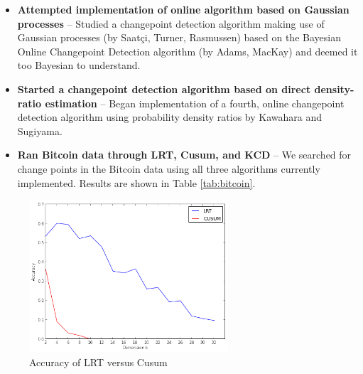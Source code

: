 \documentclass[10pt,letterpaper]{article}
\begin{document}
\begin{itemize}
\item \textbf{Attempted implementation of online algorithm based on Gaussian processes} -- Studied a changepoint detection algorithm making use of Gaussian processes (by Saat\c{c}i, Turner, Rasmussen) based on the Bayesian Online Changepoint Detection algorithm (by Adams, MacKay) and deemed it too Bayesian to understand.
\item \textbf{Started a changepoint detection algorithm based on direct density-ratio estimation} -- Began implementation of a fourth, online changepoint detection algorithm using probability density ratios by Kawahara and Sugiyama.

\item \textbf{Ran Bitcoin data through LRT, Cusum, and KCD} -- We searched for change points in the Bitcoin data using all three algorithms currently implemented. Results are shown in Table \ref{tab:bitcoin}.

\end{itemize}

\begin{figure}[htbp]
\begin{center}
\includegraphics[width=0.66\textwidth]{LrtVCusum.png}
\caption{Accuracy of LRT versus Cusum}
\label{fig:lrtVcusum}
\end{center}
\end{figure}
\end{document}
